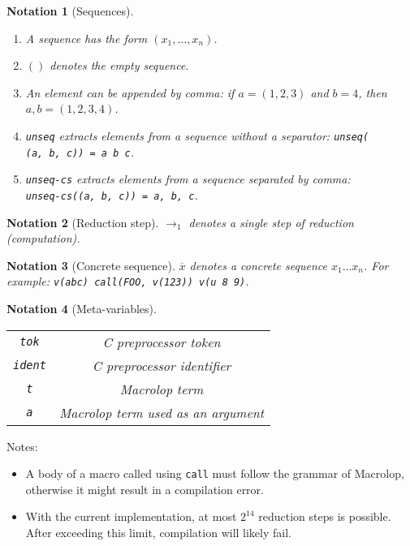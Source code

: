 \documentclass[12pt]{article}
\theoremstyle{break}
\newtheorem{notation}{Notation}
\begin{document}
\label{SequencesNotation}
\begin{notation}[Sequences]
    \begin{enumerate}
        \item A sequence has the form $(x_1, \ldots, x_n)$.
        \item $()$ denotes the empty sequence.
        \item An element can be appended by comma: if $a = (1, 2, 3)$ and $b = 4$, then $a, b = (1, 2, 3, 4)$.
        \item \texttt{unseq} extracts elements from a sequence without a separator:
        \texttt{unseq( \\ (a, b, c)) = a b c}.
        \item \texttt{unseq-cs} extracts elements from a sequence separated by comma: \\
        \texttt{unseq-cs((a, b, c)) = a, b, c}.
    \end{enumerate}
\end{notation}

\begin{notation}[Reduction step]
    $\to_1$ denotes a single step of reduction (computation).
\end{notation}

\begin{notation}[Concrete sequence]
    $\overline{x}$ denotes a concrete sequence $x_1 \ldots x_n$. For example:
    \texttt{v(abc) call(FOO, v(123)) v(u 8 9)}.
\end{notation}

\begin{notation}[Meta-variables]
    \ \\
    \begin{tabular}{|c|c|}
        \hline
        \texttt{tok} & C preprocessor token \\
        \texttt{ident} & C preprocessor identifier \\
        \texttt{t} & Macrolop term \\
        \texttt{a} & Macrolop term used as an argument \\
        \hline
    \end{tabular}
\end{notation}

Notes:

\begin{itemize}
    \item A body of a macro called using \texttt{call} must follow the grammar of
    Macrolop, otherwise it might result in a compilation error.
    \item With the current implementation, at most $2^{14}$ reduction steps is
    possible. After exceeding this limit, compilation will likely fail.
\end{itemize}

\printbibliography
\end{document}
